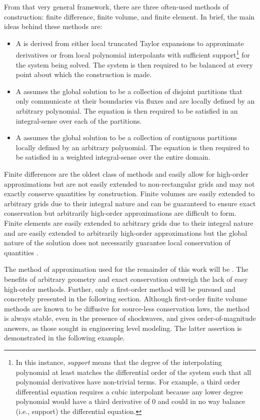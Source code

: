 From that very general framework, there are three often-used methods of construction: finite difference, finite volume, and finite element.
In brief, the main ideas behind these methods are:
\begin{itemize}[topsep=-0.5\parskip]
    \item{A  is derived from either local truncated Taylor expansions to approximate derivatives or from local polynomial interpolants with sufficient support\footnote{In this instance, \emph{support} means that the degree of the interpolating polynomial at least matches the differential order of the system such that all polynomial derivatives have non-trivial terms.  For example, a third order differential equation requires a cubic interpolant because any lower degree polynomial would have a third derivative of $0$ and could in no way balance (i.e., support) the differential equation.} for the system being solved. The system is then required to be balanced at every point about which the construction is made.}
    \item{A  assumes the global solution to be a collection of disjoint partitions that only communicate at their boundaries via fluxes and are locally defined by an arbitrary polynomial. The equation is then required to be satisfied in an integral-sense over each of the partitions.}
    \item{A  assumes the global solution to be a collection of contiguous partitions locally defined by an arbitrary polynomial. The equation is then required to be satisfied in a weighted integral-sense over the entire domain.}
\end{itemize}
 
Finite differences are the oldest class of methods and easily allow for high-order approximations but are not easily extended to non-rectangular grids and may not exactly conserve quantities by construction.
Finite volumes are easily extended to arbitrary grids due to their integral nature and can be guaranteed to ensure exact conservation but arbitrarily high-order approximations are difficult to form.
Finite elements are easily extended to arbitrary grids due to their integral nature and are easily extended to arbitrarily high-order approximations but the global nature of the solution does not necessarily guarantee local conservation of quantities \cite{zienkiewicz_finite_2013}.

The method of approximation used for the remainder of this work will be .
The benefits of arbitrary geometry and exact conservation outweigh the lack of easy high-order methods.
Further, only a first-order method will be pursued and concretely presented in the following section.
Although first-order finite volume methods are known to be diffusive for source-less conservation laws, the method is always stable, even in the presence of shockwaves, and gives order-of-magnitude answers, as those sought in engineering level modeling.
The latter assertion is demonstrated in the following example.

